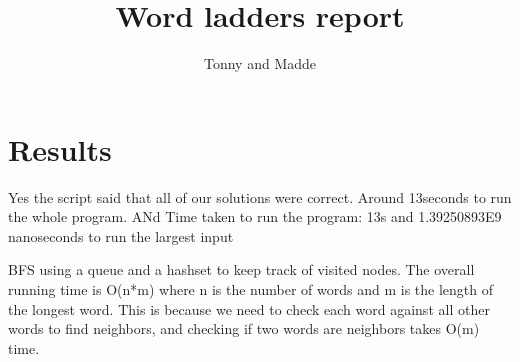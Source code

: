 \documentclass{article}
\title{Word ladders report}
\author{Tonny and Madde}
\begin{document}
  \maketitle

  \section{Results}

  Yes the script said that all of our solutions were correct. Around 13seconds to run the whole program. ANd Time taken to run the program: 13s and 1.39250893E9 nanoseconds to run the largest input

  BFS using a queue and a hashset to keep track of visited nodes. The overall running time is O(n*m) where n is the number of words and m is the length of the longest word. This is because we need to check each word against all other words to find neighbors, and checking if two words are neighbors takes O(m) time.
\end{document}
